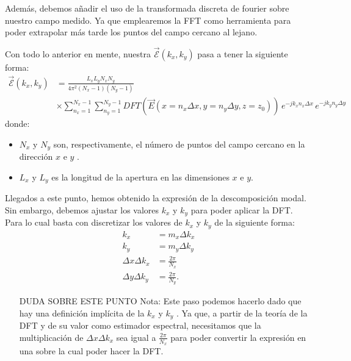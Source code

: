 \documentclass{article}
\begin{document}
Además, debemos añadir el uso de la transformada discreta de fourier sobre nuestro campo medido. Ya que emplearemos la FFT como herramienta para poder extrapolar más tarde los puntos del campo cercano al lejano.

\newpage
Con todo lo anterior en mente,  nuestra $\vec{\mathcal{E}}(k_{x},k_{y})$ pasa a tener la siguiente forma: 
\begin{align}
{\vec{\mathcal{E}}}(k_{x},k_{y})&=\frac{L_{x}L_{y}N_{x}N_{y}}{4 \pi^2 (N_{x}-1)(N_{y}-1)} \nonumber \\
&\times \sum_{n_{x}=1}^{N_{x}-1}\sum_{n_{y}=1}^{N_{y}-1} DFT(\vec{E}(x=n_{x}\Delta
x,y=n_{y}\Delta
y,z=z_{0}))\,e^{-j k_{x}n_{x} \Delta x}\,e^{-jk_{y}n_{y} \Delta y}
\label{eq-fourier2}
\end{align}
donde:
\begin{itemize}
    \item $N_{x}$ y $N_{y}$ son, respectivamente, el número de puntos del campo cercano en la dirección $x$ e $y$ .
    \item $L_{x}$ y $L_{y}$  es la longitud de la apertura en las dimensiones  $x$ e $y$.
\end{itemize}

   Llegados a este punto, hemos obtenido la expresión de la descomposición modal. Sin embargo, debemos ajustar los valores  $k_{x}$ y $k_{y}$ para poder aplicar la DFT. Para lo cual basta con discretizar los valores de  $k_{x}$ y $k_{y}$  de la siguiente forma: 
\begin{subequations}
\begin{align}
k_{x}&= m_{x}\Delta k_{x}
\\
k_{y}&= m_{y}\Delta k_{y}
\\
\Delta x \Delta k_{x}&=\frac{2\pi}{N_{x}}
\\
\Delta y \Delta k_{y}&=\frac{2\pi}{N_{y}}.
\end{align}
\end{subequations}

\begin{itemize}
    \item [DUDA SOBRE ESTE PUNTO]Nota: Este paso podemos hacerlo dado que hay una definición implícita de la $k_{x}$ y $k_{y}$ . Ya que, a partir de la teoría de la DFT  y de su valor como estimador espectral, necesitamos que la multiplicación de $\Delta x \Delta k_{x}$ sea igual a $\frac{2\pi}{N_{x}}$ para poder convertir la expresión en una sobre la cual poder hacer la DFT. 
\end{itemize}
\end{document}
